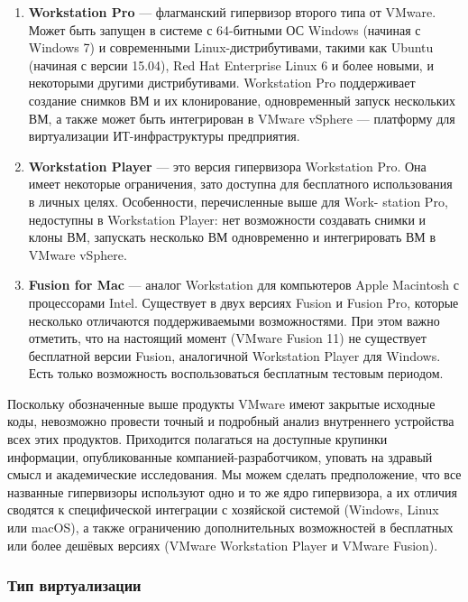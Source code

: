 \documentclass[14pt, a4paper]{article}
\begin{document}
\begin{enumerate}
    \item \textbf{Workstation Pro} — флагманский гипервизор второго типа от VMware. Может быть запущен в
    системе с 64-битными ОС Windows (начиная с Windows 7) и современными
    Linux-дистрибутивами, такими как Ubuntu (начиная с версии 15.04), Red Hat Enterprise Linux 6 и
    более новыми, и некоторыми другими дистрибутивами. Workstation Pro поддерживает
    создание снимков ВМ и их клонирование, одновременный запуск нескольких ВМ, а также
    может быть интегрирован в VMware vSphere — платформу для виртуализации
    ИТ-инфраструктуры предприятия.
    \item \textbf{Workstation Player} — это версия гипервизора Workstation Pro. Она имеет некоторые
    ограничения, зато доступна для бесплатного использования в личных целях. Особенности,
    перечисленные выше для Work- station Pro, недоступны в Workstation Player: нет возможности
    создавать снимки и клоны ВМ, запускать несколько ВМ одновременно и интегрировать ВМ в
    VMware vSphere.
    \item \textbf{Fusion for Mac} — аналог Workstation для компьютеров Apple Macintosh с процессорами Intel.
    Существует в двух версиях Fusion и Fusion Pro, которые несколько отличаются
    поддерживаемыми возможностями. При этом важно отметить, что на настоящий момент
    (VMware Fusion 11) не существует бесплатной версии Fusion, аналогичной Workstation Player
    для Windows. Есть только возможность воспользоваться бесплатным тестовым периодом.
\end{enumerate}

Поскольку обозначенные выше продукты VMware имеют закрытые исходные коды, невозможно
провести точный и подробный анализ внутреннего устройства всех этих продуктов. Приходится
полагаться на доступные крупинки информации, опубликованные компанией-разработчиком, уповать
на здравый смысл и академические исследования. Мы можем сделать предположение, что все
названные гипервизоры используют одно и то же ядро гипервизора, а их отличия сводятся к
специфической интеграции с хозяйской системой (Windows, Linux или macOS), а также ограничению
дополнительных возможностей в бесплатных или более дешёвых версиях (VMware Workstation Player
и VMware Fusion).

\subsubsection*{Тип виртуализации}
\end{document}
